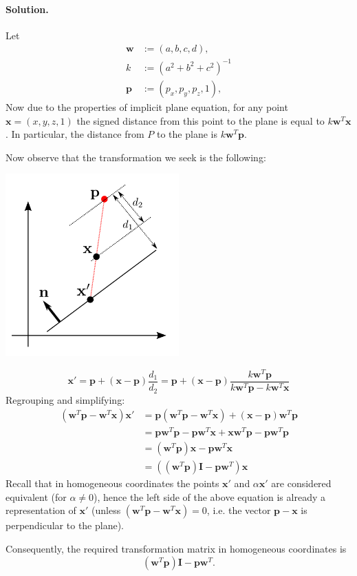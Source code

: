 \documentclass{article}
\newcommand{\bw}{\mathbf{w}}
\newcommand{\bx}{\mathbf{x}}
\newcommand{\bp}{\mathbf{p}}
\newcommand{\bI}{\mathbf{I}}
\begin{document}
\begin{enumerate}
\paragraph{Solution.}
Let
\begin{align*}
\bw &:= (a,b,c,d),\\
k &:= (a^2 + b^2 + c^2)^{-1}\\
\bp &:= (p_x, p_y, p_z, 1),
\end{align*}
Now due to the properties of implicit plane equation, for any point $\bx = (x, y, z, 1)$ the signed distance from this point to the plane is equal to $k\bw^T\bx$. In particular, the distance from $P$ to the plane is $k\bw^T\bp$.

Now observe that the transformation we seek is the following:
\begin{center}
\includegraphics[width=0.5\textwidth]{projection3.png}
\end{center}
$$
\bx' = \bp + (\bx - \bp)\frac{d_1}{d_2} = \bp + (\bx - \bp)\frac{k\bw^T\bp}{k\bw^T\bp - k\bw^T\bx}
$$
Regrouping and simplifying:
\begin{align*}
(\bw^T\bp - \bw^T\bx)\bx' &= \bp(\bw^T\bp - \bw^T\bx) + (\bx - \bp)\bw^T\bp \\
&= \bp\bw^T\bp - \bp\bw^T\bx + \bx\bw^T\bp - \bp\bw^T\bp \\
&= (\bw^T\bp)\bx - \bp\bw^T\bx \\
&= ((\bw^T\bp)\bI - \bp\bw^T)\bx
\end{align*}
Recall that in homogeneous coordinates the points $\bx'$ and $\alpha\bx'$ are considered equivalent (for $\alpha \neq 0$), hence the left side of the above equation is already a representation of $\bx'$ (unless $(\bw^T\bp - \bw^T\bx) = 0$, i.e. the vector $\bp-\bx$ is perpendicular to the plane).

Consequently, the required transformation matrix in homogeneous coordinates is
$$(\bw^T\bp)\bI - \bp\bw^T.$$


\end{enumerate}
\end{document}
